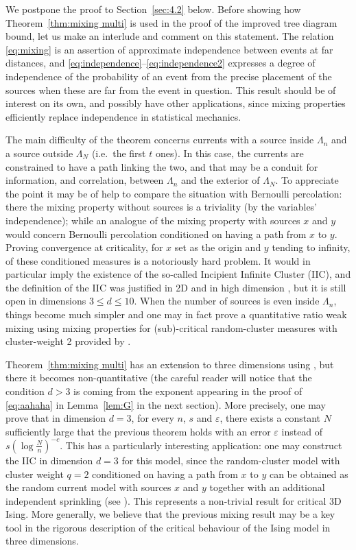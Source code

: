 \documentclass[a4paper,oneside,11pt]{article}
\numberwithin{equation}{section}
\numberwithin{equation}{section}
\numberwithin{equation}{section}
\newcommand{\ep}{\varepsilon}
\begin{document}
We postpone the proof to Section~\ref{sec:4.2} below.  Before showing how Theorem~\ref{thm:mixing multi} is used in the proof of the improved tree diagram bound, let us make an interlude and comment on this statement.
\bigbreak
{} 
 The relation \eqref{eq:mixing} is an assertion of approximate independence between events at far distances, and \eqref{eq:independence}--\eqref{eq:independence2} expresses a degree of   independence of the probability of an event  from the precise placement of  the sources when these are far from the event in question.   This result should be of interest on its own, and possibly have other applications, since mixing properties efficiently replace independence in statistical mechanics. 

The main difficulty of the theorem concerns currents with a source inside $\Lambda_n$ and a source outside $\Lambda_N$ (i.e.~the first $t$ ones). In this case, the currents are constrained to have a path linking the two, and that may be a conduit for information, and correlation,  between $\Lambda_n$ and the exterior of $\Lambda_N$.   
To appreciate the point it may be of help to compare the situation  with Bernoulli percolation: there the mixing property without sources is a triviality (by the variables' independence); while  an analogue of the mixing property with sources $x$ and $y$ would concern  Bernoulli percolation conditioned on having a path from $x$ to $y$.  Proving convergence at criticality, for $x$ set as the origin and $y$ tending to infinity, of these conditioned measures is a notoriously hard problem.  It would in particular imply the existence of the so-called Incipient Infinite Cluster (IIC), and the definition of the IIC was justified in 2D \cite{Kes86} and in high dimension \cite{HofJar04}, but it is still open in dimensions $3\le d\le 10$. When the number  of sources is even inside $\Lambda_n$, things become much simpler and one may in fact prove a quantitative ratio weak mixing using mixing properties for (sub)-critical random-cluster measures with cluster-weight 2 provided by \cite{AizDumSid15}. 

Theorem~\ref{thm:mixing multi}   has an extension to three dimensions using \cite{AizDumSid15}, but there it becomes non-quantitative (the careful reader will notice that the condition $d>3$ is coming from the exponent appearing in the proof of \eqref{eq:aahaha} in Lemma~\ref{lem:G} in the next section). More precisely, one may prove that in dimension $d=3$, for every $n$, $s$ and $\ep$, there exists a constant $N$ sufficiently large that the previous theorem holds with an error $\ep$ instead of $s(\log \tfrac Nn)^{-c}$. This has a particularly interesting application: one may construct the IIC in dimension $d=3$ for this model, since the random-cluster model with cluster weight $q=2$ conditioned on having a path from $x$ to $y$ can be obtained as the random current model with sources $x$ and $y$ together with an additional independent sprinkling (see \cite{AizDumTasWar18}).  This represents a non-trivial result for critical 3D Ising. More generally, we believe that the previous mixing result may be a key tool in the rigorous description of the critical behaviour of the Ising model in three dimensions.
\end{document}
